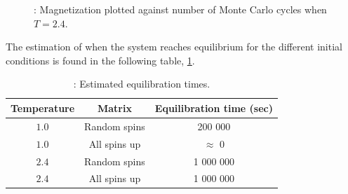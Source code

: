 \documentclass{article}
\begin{document}
{		\begin{figure}[H]
		\caption{: Magnetization plotted against number of Monte Carlo cycles when $T = 2.4$. }
		\label{fig:steady_M_highT}
		\end{figure}

		The estimation of when the system reaches equilibrium for the different initial conditions is found in the following table, \ref{Tab:equilibration_times}.


		{\renewcommand{\arraystretch}{1.5}
		\begin{table}[h!]
			\caption{: Estimated equilibration times.}
				\label{Tab:equilibration_times}
				\centering
			\begin{tabular}{c c c}
					Temperature & Matrix & Equilibration time (sec)\\
					\hline
					$1.0$ & Random spins & 200 000  \\
					$1.0$ & All spins up & $\approx$ 0 \\
					$2.4$ & Random spins & 1 000 000\\
					$2.4$ & All spins up & 1 000 000\\
				\hline
			\end{tabular}
		\end{table}

}}
\end{document}
